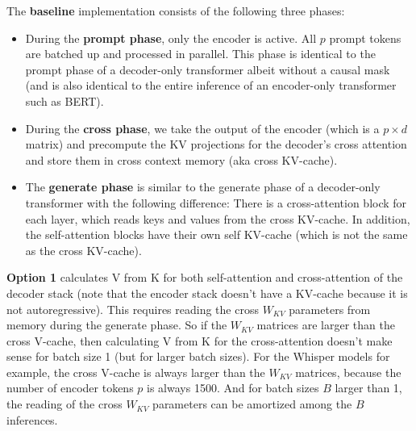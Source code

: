 \documentclass{article}
\numberwithin{equation}{section} %
\begin{document}
The \textbf{baseline} implementation consists of the following three phases:
\begin{itemize}[topsep=-1pt, itemsep=-1pt]
  \item During the \textbf{prompt phase}, only the encoder is active. All $p$ prompt tokens are batched up and processed in parallel. This phase is identical to the prompt phase of a decoder-only transformer albeit without a causal mask (and is also identical to the entire inference of an encoder-only transformer such as BERT).
  \item During the \textbf{cross phase}, we take the output of the encoder (which is a $p \times d$ matrix) and precompute the KV projections for the decoder’s cross attention and store them in cross context memory (aka cross KV-cache).
  \item The \textbf{generate phase} is similar to the generate phase of a decoder-only transformer with the following difference: There is a cross-attention block for each layer, which reads keys and values from the cross KV-cache. In addition, the self-attention blocks have their own self KV-cache (which is not the same as the cross KV-cache).
\end{itemize}

\textbf{Option 1} calculates V from K for both self-attention and cross-attention of the decoder stack (note that the encoder stack doesn’t have a KV-cache because it is not autoregressive). This requires reading the cross $W_{KV}$ parameters from memory during the generate phase. So if the $W_{KV}$ matrices are larger than the cross V-cache, then calculating V from K for the cross-attention doesn’t make sense for batch size 1 (but for larger batch sizes). For the Whisper models for example, the cross V-cache is always larger than the $W_{KV}$ matrices, because the number of encoder tokens $p$ is always 1500. And for batch sizes $B$ larger than 1, the reading of the cross $W_{KV}$ parameters can be amortized among the $B$ inferences.
\end{document}
